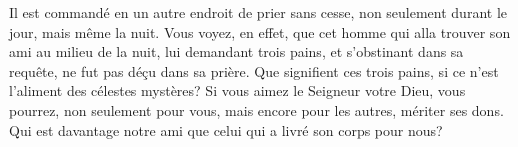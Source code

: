 Il est commandé en un autre endroit de prier sans cesse,
	non seulement durant le jour, mais même la nuit.
Vous voyez, en effet,
	que cet homme qui alla trouver son ami au milieu de la nuit,
	lui demandant trois pains, et s’obstinant dans sa requête,
	ne fut pas déçu dans sa prière.
Que signifient ces trois pains, si ce n’est l’aliment des célestes mystères?
	Si vous aimez le Seigneur votre Dieu,
	vous pourrez, non seulement pour vous, mais encore pour les autres,
	mériter ses dons.
Qui est davantage notre ami que celui qui a livré son corps pour nous?
